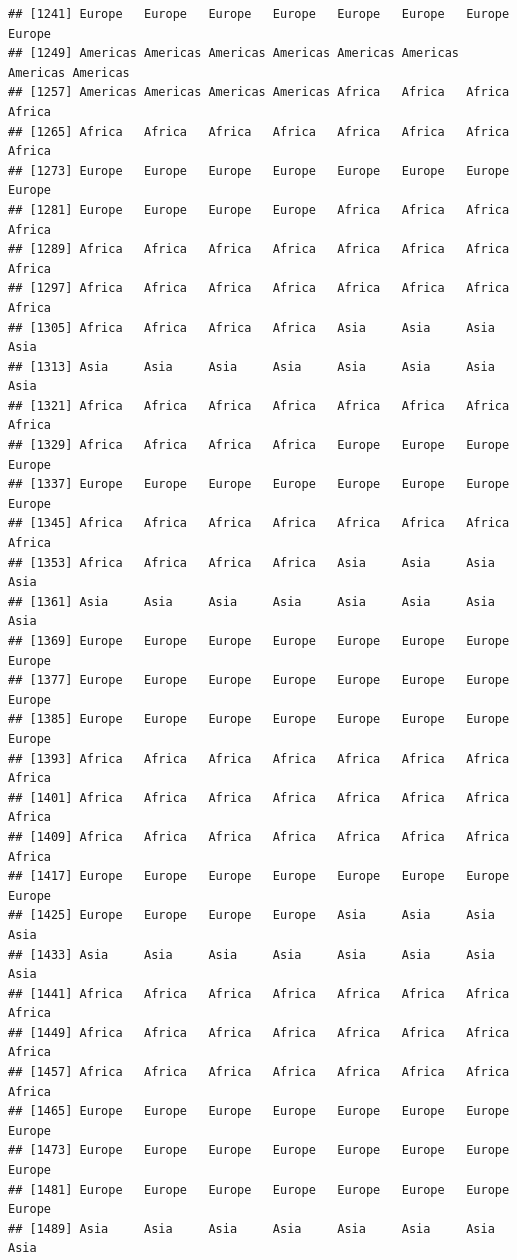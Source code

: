 \documentclass[
]{article}
\begin{document}
\begin{verbatim}
## [1241] Europe   Europe   Europe   Europe   Europe   Europe   Europe   Europe  
## [1249] Americas Americas Americas Americas Americas Americas Americas Americas
## [1257] Americas Americas Americas Americas Africa   Africa   Africa   Africa  
## [1265] Africa   Africa   Africa   Africa   Africa   Africa   Africa   Africa  
## [1273] Europe   Europe   Europe   Europe   Europe   Europe   Europe   Europe  
## [1281] Europe   Europe   Europe   Europe   Africa   Africa   Africa   Africa  
## [1289] Africa   Africa   Africa   Africa   Africa   Africa   Africa   Africa  
## [1297] Africa   Africa   Africa   Africa   Africa   Africa   Africa   Africa  
## [1305] Africa   Africa   Africa   Africa   Asia     Asia     Asia     Asia    
## [1313] Asia     Asia     Asia     Asia     Asia     Asia     Asia     Asia    
## [1321] Africa   Africa   Africa   Africa   Africa   Africa   Africa   Africa  
## [1329] Africa   Africa   Africa   Africa   Europe   Europe   Europe   Europe  
## [1337] Europe   Europe   Europe   Europe   Europe   Europe   Europe   Europe  
## [1345] Africa   Africa   Africa   Africa   Africa   Africa   Africa   Africa  
## [1353] Africa   Africa   Africa   Africa   Asia     Asia     Asia     Asia    
## [1361] Asia     Asia     Asia     Asia     Asia     Asia     Asia     Asia    
## [1369] Europe   Europe   Europe   Europe   Europe   Europe   Europe   Europe  
## [1377] Europe   Europe   Europe   Europe   Europe   Europe   Europe   Europe  
## [1385] Europe   Europe   Europe   Europe   Europe   Europe   Europe   Europe  
## [1393] Africa   Africa   Africa   Africa   Africa   Africa   Africa   Africa  
## [1401] Africa   Africa   Africa   Africa   Africa   Africa   Africa   Africa  
## [1409] Africa   Africa   Africa   Africa   Africa   Africa   Africa   Africa  
## [1417] Europe   Europe   Europe   Europe   Europe   Europe   Europe   Europe  
## [1425] Europe   Europe   Europe   Europe   Asia     Asia     Asia     Asia    
## [1433] Asia     Asia     Asia     Asia     Asia     Asia     Asia     Asia    
## [1441] Africa   Africa   Africa   Africa   Africa   Africa   Africa   Africa  
## [1449] Africa   Africa   Africa   Africa   Africa   Africa   Africa   Africa  
## [1457] Africa   Africa   Africa   Africa   Africa   Africa   Africa   Africa  
## [1465] Europe   Europe   Europe   Europe   Europe   Europe   Europe   Europe  
## [1473] Europe   Europe   Europe   Europe   Europe   Europe   Europe   Europe  
## [1481] Europe   Europe   Europe   Europe   Europe   Europe   Europe   Europe  
## [1489] Asia     Asia     Asia     Asia     Asia     Asia     Asia     Asia    

\end{verbatim}
\end{document}

